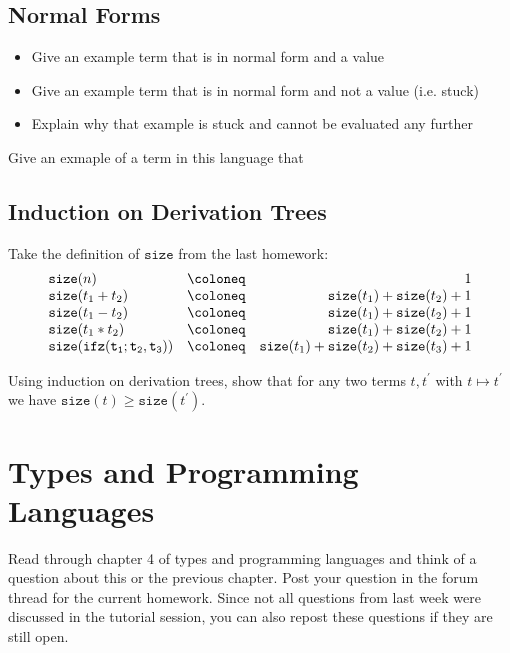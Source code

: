 \subsection*{Normal Forms}

\begin{itemize}
  \item Give an example term that is in normal form and a value
  \item Give an example term that is in normal form and not a value (i.e. stuck)
  \item Explain why that example is stuck and cannot be evaluated any further 
\end{itemize}
Give an exmaple of a term in this language that 

\subsection*{Induction on Derivation Trees}
Take the definition of $\mathtt{size}$ from the last homework:
\[
\begin{array}{l c r}
\mathtt{size}(n) & \coloneq&  1\\
\mathtt{size}(t_1+t_2) &\coloneq& \mathtt{size}(t_1)+\mathtt{size}(t_2) + 1\\
\mathtt{size}(t_1-t_2) &\coloneq& \mathtt{size}(t_1)+\mathtt{size}(t_2) + 1\\
\mathtt{size}(t_1*t_2) &\coloneq& \mathtt{size}(t_1)+\mathtt{size}(t_2) + 1\\
\mathtt{size}(\mathtt{ifz(t_1;t_2,t_3)}) &\coloneq& \mathtt{size}(t_1)+\mathtt{size}(t_2)+\mathtt{size}(t_3) + 1
\end{array}
\]

Using induction on derivation trees, show that for any two terms $t,t^{\prime}$ with $t\mapsto t^{\prime}$ we have $\mathtt{size}(t) \geq \mathtt{size}(t^{\prime})$.

\section*{Types and Programming Languages}
Read through chapter 4 of types and programming languages and think of a question about this or the previous chapter.
Post your question in the forum thread for the current homework.
Since not all questions from last week were discussed in the tutorial session, you can also repost these questions if they are still open.
